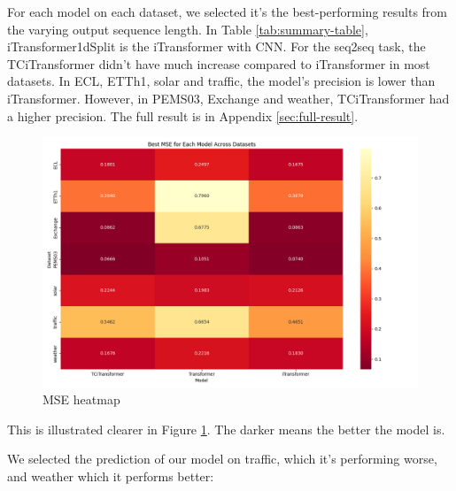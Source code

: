 \documentclass[stu,12pt,floatsintext]{apa7}
\begin{document}
For each model on each dataset, we selected it's the best-performing results from the varying output sequence length. In Table \ref{tab:summary-table}, iTransformer1dSplit is the iTransformer with CNN. For the seq2seq task, the TCiTransformer didn't have much increase compared to iTransformer in most datasets. In ECL, ETTh1, solar and traffic, the model's precision is lower than iTransformer. However, in PEMS03, Exchange and weather, TCiTransformer had a higher precision. The full result is in Appendix \ref{sec:full-result}.

\begin{figure}[H]
    \centering
    \includegraphics[width=\linewidth]{images/mse_heatmap.png}
    \caption{MSE heatmap}
    \label{fig:mse-heatmap}
\end{figure}

This is illustrated clearer in Figure \ref{fig:mse-heatmap}. The darker means the better the model is.

We selected the prediction of our model on traffic, which it's performing worse, and weather which it performs better:
\end{document}
